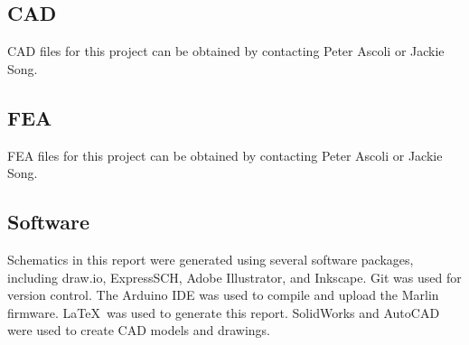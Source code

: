 \subsection{CAD}
CAD files for this project can be obtained by contacting Peter Ascoli or Jackie Song.

\subsection{FEA}
FEA files for this project can be obtained by contacting Peter Ascoli or Jackie Song.

\subsection{Software}
Schematics in this report were generated using several software packages, including draw.io, ExpressSCH, Adobe Illustrator, and Inkscape. Git was used for version control. The Arduino IDE was used to compile and upload the Marlin firmware. \LaTeX\ was used to generate this report. SolidWorks and AutoCAD were used to create CAD models and drawings. 
